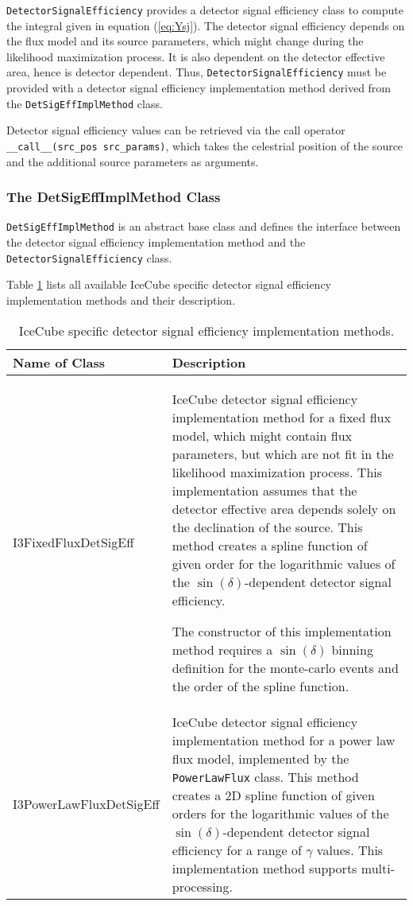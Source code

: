 \documentclass{article}
\newcommand{\eq}[1]{(\ref{#1})}
\newcommand{\code}[1]{\texttt{#1}}
\newcommand{\class}[1]{\colorbox{blue!30}{\code{#1}}}
\begin{document}
\class{DetectorSignalEfficiency} provides a detector signal efficiency class to
compute the integral given in equation \eq{eq:Ysj}. The detector signal
efficiency depends on the flux model and its source parameters, which might
change during the likelihood maximization process. It is also dependent on the
detector effective area, hence is detector dependent. Thus,
\class{DetectorSignalEfficiency} must be provided with a detector signal
efficiency implementation method derived from the \class{DetSigEffImplMethod}
class.

Detector signal efficiency values can be retrieved via the call operator
\code{\_\_call\_\_(src\_pos src\_params)}, which takes the celestrial position
of the source and the additional source parameters as arguments.

\subsubsection{The DetSigEffImplMethod Class}

\class{DetSigEffImplMethod} is an abstract base class and defines the interface
between the detector signal efficiency implementation method and the
\class{DetectorSignalEfficiency} class.

Table \ref{tbl:I3DetSigEffImplMethod} lists all available IceCube specific
detector signal efficiency implementation methods and their description.
\begin{table}
\caption{IceCube specific detector signal efficiency implementation methods.}
\label{tbl:I3DetSigEffImplMethod}

\begin{tabular}{l | p{10cm}}
\hline
Name of Class & Description \\
\hline
I3FixedFluxDetSigEff & IceCube detector signal efficiency implementation method for a
    fixed flux model, which might contain flux parameters, but which
    are not fit in the likelihood maximization process.
    This implementation assumes that the detector effective
    area depends solely on the declination of the source. This method creates
    a spline function of given order for the logarithmic values of the
    $\sin(\delta)$-dependent detector signal efficiency.

    The constructor of this implementation method requires a $\sin(\delta)$
    binning definition for the monte-carlo events and the order of the spline
    function.\\
I3PowerLawFluxDetSigEff & IceCube detector signal efficiency implementation method for a
    power law flux model, implemented by the \class{PowerLawFlux} class.
    This method creates a 2D spline function of given orders for the logarithmic
    values of the $\sin(\delta)$-dependent detector signal efficiency for a
    range of $\gamma$ values. This implementation method supports
    multi-processing.
\end{tabular}
\end{table}
\end{document}
